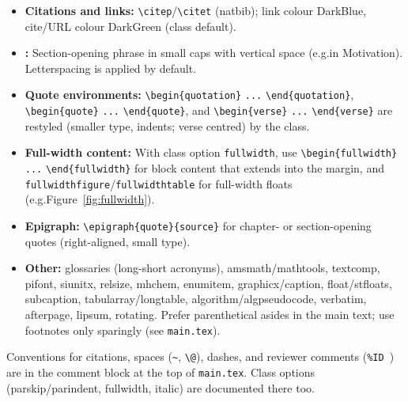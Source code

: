     \begin{itemize}
        \item \textbf{Citations and links:} \verb|\citep|/\verb|\citet| (natbib); link colour DarkBlue, cite/URL colour DarkGreen (class default).
      \item \textbf{\texttt{\string\newthought}:} Section-opening phrase in small caps with vertical space (e.g.\@ in Motivation). Letterspacing is applied by default.
        \item \textbf{Quote environments:} \verb|\begin{quotation}| \verb|...| \verb|\end{quotation}|, \verb|\begin{quote}| \verb|...| \verb|\end{quote}|, and \verb|\begin{verse}| \verb|...| \verb|\end{verse}| are restyled (smaller type, indents; verse centred) by the class.
        \item \textbf{Full-width content:} With class option \texttt{fullwidth}, use \verb|\begin{fullwidth}| \verb|...| \verb|\end{fullwidth}| for block content that extends into the margin, and \texttt{fullwidthfigure}/\texttt{fullwidthtable} for full-width floats (e.g.\@ Figure~\ref{fig:fullwidth}).
        \item \textbf{Epigraph:} \verb|\epigraph{quote}{source}| for chapter- or section-opening quotes (right-aligned, small type).
      \item \textbf{Other:} glossaries (long-short acronyms), amsmath/mathtools, textcomp, pifont, siunitx, relsize, mhchem, enumitem, graphicx/caption, float/stfloats, subcaption, tabularray/longtable, algorithm/algpseudocode, verbatim, afterpage, lipsum, rotating. Prefer parenthetical asides in the main text; use footnotes only sparingly (see \texttt{main.tex}).
    \end{itemize}

    Conventions for citations, spaces (\verb|~|, \verb|\@|), dashes, and reviewer comments (\verb|%ID |) are in the comment block at the top of \texttt{main.tex}. Class options (parskip/parindent, fullwidth, italic) are documented there too.
